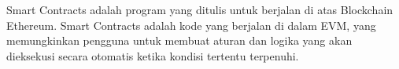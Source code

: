 Smart Contracts adalah program yang ditulis untuk berjalan di atas Blockchain Ethereum. Smart Contracts adalah kode yang berjalan di dalam EVM, yang memungkinkan pengguna untuk membuat aturan dan logika yang akan dieksekusi secara otomatis ketika kondisi tertentu terpenuhi. 


